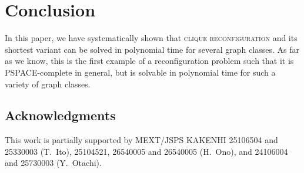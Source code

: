\documentclass{llncs}
\begin{document}
	\section{Conclusion}
	In this paper, we have systematically shown that \textsc{clique reconfiguration} and its shortest variant can be solved in polynomial time for several graph classes. 
	As far as we know, this is the first example of a reconfiguration problem such that it is PSPACE-complete in general, but is solvable in polynomial time for such a variety of graph classes.

	\subsection*{Acknowledgments}
	This work is partially supported by MEXT/JSPS KAKENHI 25106504 and 25330003 (T.~Ito), 25104521, 26540005 and 26540005 (H.~Ono), and 24106004 and 25730003 (Y.~Otachi).
\end{document}
